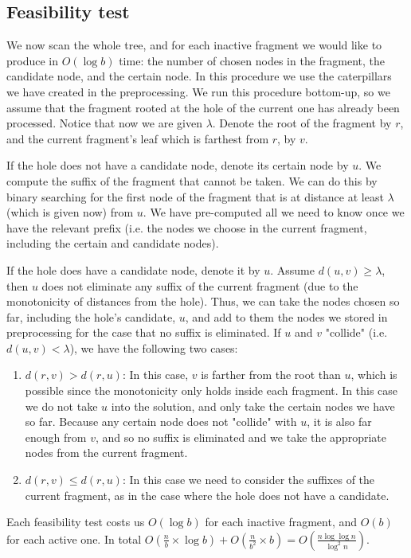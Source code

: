 \documentclass[11pt,a4paper]{article}
\theoremstyle{definition}
\theoremstyle{remark}
\begin{document}
\subsection{Feasibility test}
We now scan the whole tree, and for each inactive fragment we would like to produce in $O(\log b)$ time: the number of chosen nodes in the fragment, the candidate node, and the certain node. In this procedure we use the caterpillars we have created in the preprocessing. We run this procedure bottom-up, so we assume that the fragment rooted at the hole of the current one has already been processed. Notice that now we are given $\lambda$. Denote the root of the fragment by $r$, and the current fragment's leaf which is farthest from $r$, by $v$.

If the hole does not have a candidate node, denote its certain node by $u$. We compute the suffix of the fragment that cannot be taken. We can do this by binary searching for the first node of the fragment that is at distance at least $\lambda$ (which is given now) from $u$. We have pre-computed all we need to know once we have the relevant prefix (i.e. the nodes we choose in the current fragment, including the certain and candidate nodes).

If the hole does have a candidate node, denote it by $u$. Assume $d(u,v) \geq \lambda$, then $u$ does not eliminate any suffix of the current fragment (due to the monotonicity of distances from the hole). Thus, we can take the nodes chosen so far, including the hole's candidate, $u$, and add to them the nodes we stored in preprocessing for the case that no suffix is eliminated. If $u$ and $v$ "collide" (i.e. $d(u,v) < \lambda$), we have the following two cases:
\begin{enumerate}
\item $d(r,v) > d(r,u)$: In this case, $v$ is farther from the root than $u$, which is possible since the monotonicity only holds inside each fragment. In this case we do not take $u$ into the solution, and only take the certain nodes we have so far. Because any certain node does not "collide" with $u$, it is also far enough from $v$, and so no suffix is eliminated and we take the appropriate nodes from the current fragment.
\item $d(r,v) \leq d(r,u)$: In this case we need to consider the suffixes of the current fragment, as in the case where the hole does not have a candidate.
\end{enumerate}
Each feasibility test costs us $O(\log b)$ for each inactive fragment, and $O(b)$ for each active one. In total $O(\frac{n}{b} \times \log b) + O(\frac{n}{b^2} \times b) = O(\frac{n \log \log n}{\log ^2n})$.
\end{document}
